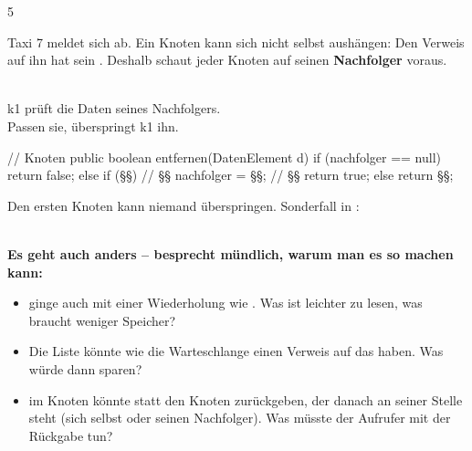 \documentclass[11pt,a4paper]{article}
\begin{document}
\begin{aufgabe}{5}
\begin{minipage}[t]{0.42\linewidth}
\vspace{0pt}\raggedright
Taxi 7 meldet sich ab. Ein Knoten kann sich nicht selbst aushängen: Den Verweis auf ihn hat sein . Deshalb schaut jeder Knoten auf seinen \textbf{Nachfolger} voraus.\\[1mm]
\\[1mm]
\scriptsize {} k1 prüft die Daten seines Nachfolgers.\\
 Passen sie, überspringt k1 ihn.
\end{minipage}\hfill
\begin{minipage}[t]{0.55\linewidth}
\vspace{0pt}
\begin{java}[basicstyle=\ttfamily\scriptsize]
// Knoten
public boolean entfernen(DatenElement d) {
   if (nachfolger == null) {
      return false;
   } else if (§§) { // §§
      nachfolger = §§; // §§
      return true;
   } else {
      return §§;
   }
}
\end{java}
\small Den ersten Knoten kann niemand überspringen. Sonderfall in :\\[0.5mm]
\\ \code{;}
\end{minipage}
\end{aufgabe}

\begin{hinweis}\small
\textbf{Es geht auch anders -- besprecht mündlich, warum man es so machen kann:}
\begin{itemize}
\item {} ginge auch mit einer Wiederholung wie . Was ist leichter zu lesen, was braucht weniger Speicher?
\item Die Liste könnte wie die Warteschlange einen Verweis auf das  haben. Was würde  dann sparen?
\item {} im Knoten könnte statt  den Knoten zurückgeben, der danach an seiner Stelle steht (sich selbst oder seinen Nachfolger). Was müsste der Aufrufer mit der Rückgabe tun?
\end{itemize}
\end{hinweis}
\end{document}
